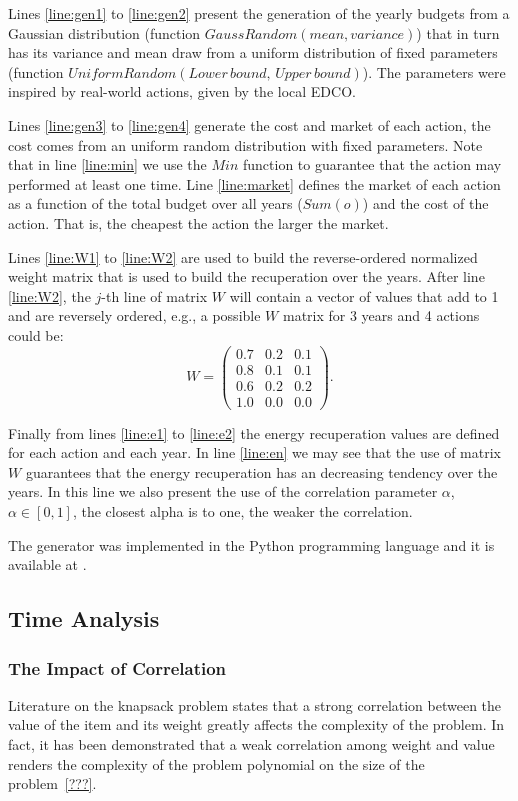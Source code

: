 Lines \ref{line:gen1} to \ref{line:gen2} present the generation of the yearly budgets from a Gaussian
distribution (function $GaussRandom(mean, variance)$) that in turn has its variance and mean draw 
from a uniform distribution of fixed parameters (function $UniformRandom(Lower\,bound,\,Upper\,bound)$).
The parameters were inspired by real-world actions, given by the local EDCO.

Lines \ref{line:gen3} to \ref{line:gen4} generate the cost and market of each action, the cost comes from
an uniform random distribution with fixed parameters. Note that in line \ref{line:min} we
use the $Min$ function to guarantee that the action may performed at least one time. Line \ref{line:market}
defines the market of each action as a function of the total budget over all years ($Sum(o)$) and the
cost of the action. That is, the cheapest the action the larger the market.

Lines \ref{line:W1} to \ref{line:W2} are used to build the reverse-ordered normalized weight matrix that is used to 
build the recuperation over the years. After line \ref{line:W2}, the $j$-th line of matrix $W$ will contain
a vector of values that add to 1 and are reversely ordered, e.g., a possible $W$ matrix for 3 years and 4 actions
could be:
\[ W = \left( \begin{array}{ccc}
0.7 & 0.2 & 0.1 \\
0.8 & 0.1 & 0.1 \\
0.6 & 0.2 & 0.2 \\
1.0 & 0.0 & 0.0 \end{array} \right).\] 

Finally from lines \ref{line:e1} to \ref{line:e2} the energy recuperation values are defined for each action
and each year. In line \ref{line:en} we may see that the use of matrix $W$ guarantees that the energy recuperation has an decreasing tendency
over the years. In this line we also present the use of the correlation parameter $\alpha$, $\alpha \in [0,1]$,
the closest alpha is to one, the weaker the correlation.

The generator was implemented in the Python programming language and it is available at .

\subsection{Time Analysis}

\subsubsection{The Impact of Correlation}
Literature on the knapsack problem states that a strong correlation between the value of the item
and its weight greatly affects the complexity of the problem. In fact, it has been demonstrated
that a weak correlation among weight and value renders the complexity of the problem polynomial
on the size of the problem~\ref{???}.

